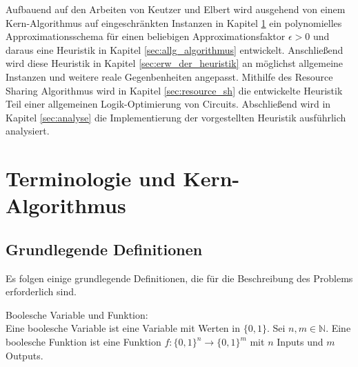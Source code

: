 \documentclass[11pt, a4paper, german]{article}
\begin{document}
Aufbauend auf den Arbeiten von Keutzer \cite{DAGON} und  Elbert \cite{Elbert} wird ausgehend von einem Kern-Algorithmus auf eingeschränkten Instanzen in Kapitel \ref{sec:terminologie&grundl} ein polynomielles Approximationsschema für einen beliebigen Approximationsfaktor $\epsilon > 0$ und daraus eine Heuristik in Kapitel \ref{sec:allg_algorithmus} entwickelt. Anschließend wird diese Heuristik  in Kapitel \ref{sec:erw_der_heuristik} an möglichst allgemeine Instanzen und weitere reale Gegenbenheiten angepasst. Mithilfe des Resource Sharing Algorithmus wird in Kapitel \ref{sec:resource_sh} die entwickelte Heuristik Teil einer allgemeinen Logik-Optimierung von Circuits. Abschließend wird in Kapitel \ref{sec:analyse} die Implementierung der vorgestellten Heuristik ausführlich analysiert.

\section{Terminologie und Kern-Algorithmus}
\label{sec:terminologie&grundl}
\subsection{Grundlegende Definitionen}
\label{subsec:grundlegende_definitionen}
Es folgen einige grundlegende Definitionen, die für die Beschreibung des Problems erforderlich sind.

\begin{definition}{Boolesche Variable und Funktion: } \\
Eine boolesche Variable ist eine Variable mit Werten in $ \{ 0 , 1 \} $.
Sei $ n, m \in \mathbb{N}$. Eine boolesche Funktion ist eine Funktion $ f : \{ 0 , 1 \}^n \rightarrow \{ 0 , 1 \}^m $ mit $n$ Inputs und $m$ Outputs. 
\end{definition}
\end{document}
